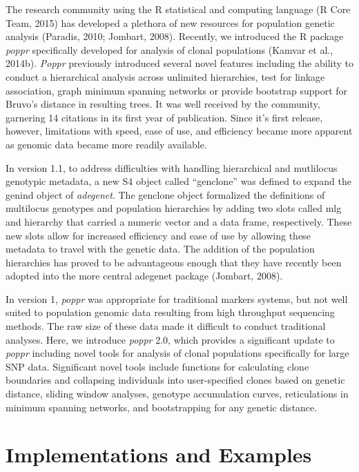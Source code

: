 \documentclass{frontiersSCNS} %
\begin{document}
The research community using the R statistical and computing language (R
Core Team, 2015) has developed a plethora of new resources for
population genetic analysis (Paradis, 2010; Jombart, 2008). Recently, we
introduced the R package \emph{poppr} specifically developed for
analysis of clonal populations (Kamvar et al., 2014b). \emph{Poppr}
previously introduced several novel features including the ability to
conduct a hierarchical analysis across unlimited hierarchies, test for
linkage association, graph minimum spanning networks or provide
bootstrap support for Bruvo's distance in resulting trees. It was well
received by the community, garnering 14 citations in its first year of
publication. Since it's first release, however, limitations with speed,
ease of use, and efficiency became more apparent as genomic data became
more readily available.

In version 1.1, to address difficulties with handling hierarchical and
mutlilocus genotypic metadata, a new S4 object called ``genclone'' was
defined to expand the genind object of \emph{adegenet}. The genclone
object formalized the definitions of multilocus genotypes and population
hierarchies by adding two slots called mlg and hierarchy that carried a
numeric vector and a data frame, respectively. These new slots allow for
increased efficiency and ease of use by allowing these metadata to
travel with the genetic data. The addition of the population hierarchies
has proved to be advantageous enough that they have recently been
adopted into the more central adegenet package (Jombart, 2008).

In version 1, \emph{poppr} was appropriate for traditional markers
systems, but not well suited to population genomic data resulting from
high throughput sequencing methods. The raw size of these data made it
difficult to conduct traditional analyses. Here, we introduce
\emph{poppr} 2.0, which provides a significant update to \emph{poppr}
including novel tools for analysis of clonal populations specifically
for large SNP data. Significant novel tools include functions for
calculating clone boundaries and collapsing individuals into
user-specified clones based on genetic distance, sliding window
analyses, genotype accumulation curves, reticulations in minimum
spanning networks, and bootstrapping for any genetic distance.

\section*{Implementations and
Examples}\label{implementations-and-examples}
\end{document}
